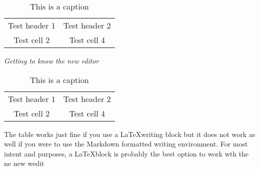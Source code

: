 \begin{table} 
    \begin{tabular}{ c c }
        Test header 1 & Test header 2 \\ 
        Test cell 2 & Test cell 4 \\ 
    \end{tabular} 
    \caption{This is a caption} 
\end{table}\textit{Getting to know the new editor}

\begin{table} 
    \begin{tabular}{ c c }
        Test header 1 & Test header 2 \\ 
        Test cell 2 & Test cell 4 \\ 
    \end{tabular} 
    \caption{This is a caption} 
\end{table}

The table works just fine if you use a \LaTeX writing block but it does not work as well if you were to use the Markdown formatted writing environment. For most intent and purposes, a \LaTeX block is probably the best option to work wth the ne new wedit 
